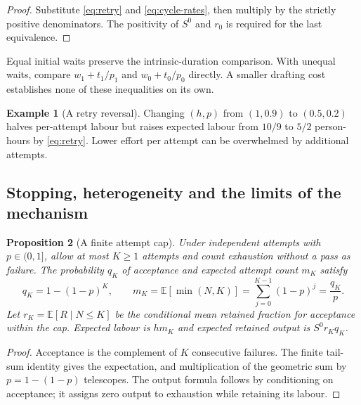\documentclass[11pt,a4paper]{amsart}
\newtheorem{proposition}{Proposition}[section]
\theoremstyle{definition}
\newtheorem{example}[proposition]{Example}
\theoremstyle{remark}
\newcommand{\E}{\mathbb E}
\begin{document}
\begin{proof}
Substitute \eqref{eq:retry} and \eqref{eq:cycle-rates}, then multiply by the strictly positive denominators. The positivity of $S^0$ and $r_0$ is required for the last equivalence.
\end{proof}

Equal initial waits preserve the intrinsic-duration comparison. With unequal waits, compare $w_1+t_1/p_1$ and $w_0+t_0/p_0$ directly. A smaller drafting cost establishes none of these inequalities on its own. \begin{example}[A retry reversal]\label{ex:retry-reversal}
Changing $(h,p)$ from $(1,0.9)$ to $(0.5,0.2)$ halves per-attempt labour but raises expected labour from $10/9$ to $5/2$ person-hours by \eqref{eq:retry}. Lower effort per attempt can be overwhelmed by additional attempts.
\end{example}

\subsection{Stopping, heterogeneity and the limits of the mechanism}

\begin{proposition}[A finite attempt cap]
\label{prop:capped}
Under independent attempts with $p\in(0,1]$, allow at most $K\geq1$ attempts and count exhaustion without a pass as failure. The probability $q_K$ of acceptance and expected attempt count $m_K$ satisfy
\begin{equation}
\label{eq:cap}
 q_K=1-(1-p)^K,\qquad
 m_K=\E[\min(N,K)]=\sum_{j=0}^{K-1}(1-p)^j=\frac{q_K}{p}.
\end{equation}
Let $r_K=\E[R\mid N\leq K]$ be the conditional mean retained fraction for acceptance within the cap. Expected labour is $hm_K$ and expected retained output is $S^0r_Kq_K$.
\end{proposition}

\begin{proof}
Acceptance is the complement of $K$ consecutive failures. The finite tail-sum identity gives the expectation, and multiplication of the geometric sum by $p=1-(1-p)$ telescopes. The output formula follows by conditioning on acceptance; it assigns zero output to exhaustion while retaining its labour.
\end{proof}
\end{document}
